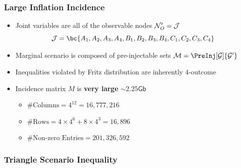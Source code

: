 \documentclass[
    hyperref={bookmarks=false},%
    xcolor={dvipsnames},
]{beamer}
\begin{document}
\begin{frame}
    \frametitle{Large Inflation Incidence}
    \begin{itemize}
        \item Joint variables are all of the observable nodes $\mathcal{N}_O' = \mathcal{J}$
        \[ \jointvar = \bc{A_1, A_2, A_3, A_4,B_1, B_2, B_3, B_4,C_1, C_2, C_3, C_4} \]
        \item Marginal scenario is composed of pre-injectable sets $\mscenario = \PreInj[\graph]{\graph'}$
        \item Inequalities violated by Fritz distribution are inherently $4$-outcome
        \item Incidence matrix $M$ is \textbf{very large} $\sim 2.25 \textsf{Gb}$
        \begin{itemize}
            \item $\# \text{Columns} = 4^{12} = 16,777,216$
            \item $\# \text{Rows} =  4\times 4^{6} + 8 \times 4^{3} = 16,896$
            \item $\# \text{Non-zero Entries} = 201,326,592$
        \end{itemize}
    \end{itemize}
\end{frame}

\begin{frame}
    \frametitle{Triangle Scenario Inequality}

\end{frame}
\end{document}
